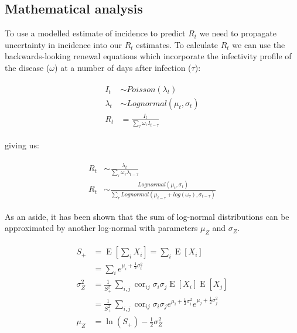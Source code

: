 \documentclass[10pt,letterpaper]{article}
\begin{document}
\subsection*{Mathematical analysis}

To use a modelled estimate of incidence to predict $R_t$ we need to propagate uncertainty in incidence into our $R_t$ estimates. To calculate $R_t$ we can use the backwards-looking renewal equations \cite{gostic2020} which incorporate the infectivity profile of the disease ($\omega$) at a number of days after infection ($\tau$):

\begin{eqnarray}
\begin{aligned}
I_t &\sim Poisson(\lambda_t) \\
\lambda_t &\sim Lognormal(\mu_t,\sigma_t) \\
R_t &= \frac{I_t}{\sum_{\tau}{\omega_{\tau}I_{t-\tau}}}
\end{aligned}
\end{eqnarray}

giving us:

\begin{eqnarray}
\begin{aligned}
R_t &\sim \frac{\lambda_t}{\sum_{\tau}{\omega_{\tau}\lambda_{t-\tau}}} \\
R_t &\sim \frac{Lognormal(\mu_t,\sigma_t)}{\sum_{\tau}{
  Lognormal( \mu_{t-\tau} + log(\omega_{\tau}) , \sigma_{t-\tau})
}}
\end{aligned}
\end{eqnarray}


As an aside, it has been shown that the sum of log-normal distributions can be approximated by another log-normal \cite{lo2013} with parameters $\mu_Z$ and $\sigma_Z$.

\begin{eqnarray}
\begin{aligned}
	S_+ &= \operatorname{E}\left[\sum_i X_i \right] = \sum_i
	\operatorname{E}[X_i] \\
	&= \sum_i e^{\mu_i + \frac{1}{2}\sigma_i^2}
	\\
	\sigma^2_{Z} &= \frac{1}{S_+^2} \, \sum_{i,j}
	  \operatorname{cor}_{ij} \sigma_i \sigma_j \operatorname{E}[X_i] \operatorname{E}[X_j] \\
	  &= \frac{1}{S_+^2} \, \sum_{i,j}
	  \operatorname{cor}_{ij} \sigma_i \sigma_j e^{\mu_i+\frac{1}{2}\sigma_i^2}
	  e^{\mu_j+\frac{1}{2}\sigma_j^2}
	\\
	\mu_Z &= \ln\left( S_+ \right) - \frac{1}{2}\sigma_{Z}^2
\end{aligned}
\end{eqnarray}
\end{document}
